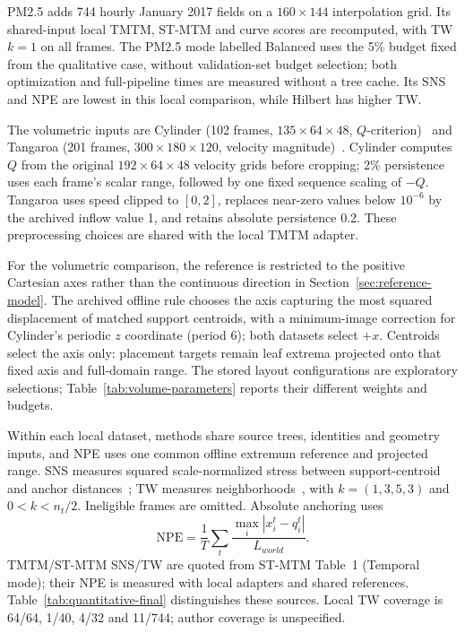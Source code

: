\documentclass[review]{vgtc}
\begin{document}
PM2.5 adds 744 hourly January 2017 fields on a $160\times144$ interpolation grid. Its shared-input local TMTM, ST-MTM and curve scores are recomputed, with TW $k=1$ on all frames. The PM2.5 mode labelled Balanced uses the 5\% budget fixed from the qualitative case, without validation-set budget selection; both optimization and full-pipeline times are measured without a tree cache. Its SNS and NPE are lowest in this local comparison, while Hilbert has higher TW.

The volumetric inputs are Cylinder (102 frames, $135\times64\times48$, $Q$-criterion)~\cite{Camarri:2005:Cylinder,Weinkauf:SquareCylinder} and Tangaroa (201 frames, $300\times180\times120$, velocity magnitude)~\cite{Popinet:2004:Tangaroa}. Cylinder computes $Q$ from the original $192\times64\times48$ velocity grids before cropping; 2\% persistence uses each frame's scalar range, followed by one fixed sequence scaling of $-Q$. Tangaroa uses speed clipped to $[0,2]$, replaces near-zero values below $10^{-6}$ by the archived inflow value 1, and retains absolute persistence 0.2. These preprocessing choices are shared with the local TMTM adapter. 

For the volumetric comparison, the reference is restricted to the positive Cartesian axes rather than the continuous direction in Section~\ref{sec:reference-model}. The archived offline rule chooses the axis capturing the most squared displacement of matched support centroids, with a minimum-image correction for Cylinder's periodic $z$ coordinate (period 6); both datasets select $+x$. Centroids select the axis only: placement targets remain leaf extrema projected onto that fixed axis and full-domain range. The stored layout configurations are exploratory selections; Table~\ref{tab:volume-parameters} reports their different weights and budgets. 

Within each local dataset, methods share source trees, identities and geometry inputs, and NPE uses one common offline extremum reference and projected range. SNS measures squared scale-normalized stress between support-centroid and anchor distances~\cite{Smelser:2025:Scale,STMTM:2026}; TW measures neighborhoods~\cite{Venna:2001:NP}, with $k=(1,3,5,3)$ and $0<k<n_t/2$. Ineligible frames are omitted. Absolute anchoring uses
\begin{equation}\label{eq:experimental-npe}
\mathrm{NPE}=\frac{1}{T}\sum_t\frac{\max_i|x_i^t-q_i^t|}{L_{world}}.
\end{equation}
TMTM/ST-MTM SNS/TW are quoted from ST-MTM Table~1 (Temporal mode); their NPE is measured with local adapters and shared references. Table~\ref{tab:quantitative-final} distinguishes these sources. Local TW coverage is 64/64, 1/40, 4/32 and 11/744; author coverage is unspecified.
\end{document}
